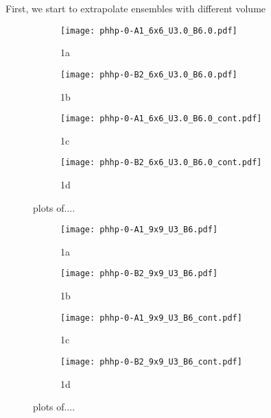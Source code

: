 First, we start to extrapolate ensembles with different volume
\begin{figure}
  \begin{subfigure}{.5\textwidth}
    \centering
    \texttt{[image: phhp-0-A1\_6x6\_U3.0\_B6.0.pdf]}
    \caption{1a}
    \label{fig:sfig1}
  \end{subfigure}%
  \begin{subfigure}{.5\textwidth}
    \centering
    \texttt{[image: phhp-0-B2\_6x6\_U3.0\_B6.0.pdf]}
    \caption{1b}
    \label{fig:sfig2}
  \end{subfigure}
  \begin{subfigure}{.5\textwidth}
      \centering
      \texttt{[image: phhp-0-A1\_6x6\_U3.0\_B6.0\_cont.pdf]}
      \caption{1c}
      \label{fig:sfig3}
  \end{subfigure}
  \begin{subfigure}{.5\textwidth}
      \centering
      \texttt{[image: phhp-0-B2\_6x6\_U3.0\_B6.0\_cont.pdf]}
      \caption{1d}
      \label{fig:sfig4}
  \end{subfigure}
  \caption{plots of....}
  \label{fig:fig}
\end{figure}

\begin{figure}
  \begin{subfigure}{.5\textwidth}
    \centering
    \texttt{[image: phhp-0-A1\_9x9\_U3\_B6.pdf]}
    \caption{1a}
    \label{fig:sfig1}
  \end{subfigure}%
  \begin{subfigure}{.5\textwidth}
    \centering
    \texttt{[image: phhp-0-B2\_9x9\_U3\_B6.pdf]}
    \caption{1b}
    \label{fig:sfig2}
  \end{subfigure}
  \begin{subfigure}{.5\textwidth}
      \centering
      \texttt{[image: phhp-0-A1\_9x9\_U3\_B6\_cont.pdf]}
      \caption{1c}
      \label{fig:sfig3}
  \end{subfigure}
  \begin{subfigure}{.5\textwidth}
      \centering
      \texttt{[image: phhp-0-B2\_9x9\_U3\_B6\_cont.pdf]}
      \caption{1d}
      \label{fig:sfig4}
  \end{subfigure}
  \caption{plots of....}
  \label{fig:fig}
\end{figure}


